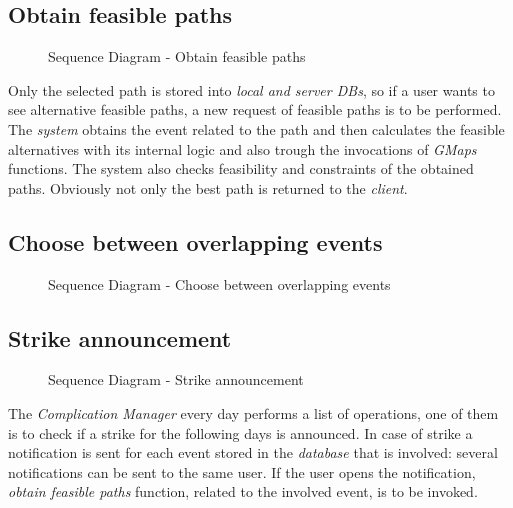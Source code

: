 \subsection{Obtain feasible paths}
	\begin{figure}[H]
		\noindent{}
		\caption{Sequence Diagram - Obtain feasible paths}
	\end{figure}
		Only the selected path is stored into \textit{local and server DBs}, so if a user wants to see alternative feasible paths, a new request of feasible paths is to be performed. 
		The \textit{system} obtains the event related to the path and then calculates the feasible alternatives with its internal logic and also trough the invocations of \textit{GMaps} functions. The system also checks feasibility and constraints of the obtained paths. Obviously not only the best path is returned to the \textit{client}.
\subsection{Choose between overlapping events}
	\begin{figure}[H]
		\noindent{}
		\caption{Sequence Diagram - Choose between overlapping events}
	\end{figure}
\subsection{Strike announcement}
	\begin{figure}[H]
		\noindent{}
		\caption{Sequence Diagram - Strike announcement}
	\end{figure}
		The \textit{Complication Manager} every day performs a list of operations, one of them is to check if a strike for the following days is announced. 
		In case of strike a notification is sent for each event stored in the \textit{database} that is involved: several notifications can be sent to the same user. 
		If the user opens the notification, \textit{obtain feasible paths} function, related to the involved event, is to be invoked.